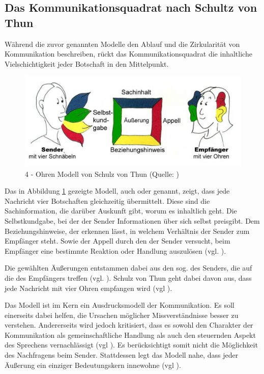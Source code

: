 \subsection{Das Kommunikationsquadrat nach Schultz von Thun}
Während die zuvor genannten Modelle den Ablauf und die Zirkularität von Kommunikation beschreiben, rückt das Kommunikationsquadrat die inhaltliche Vielschichtigkeit jeder Botschaft in den Mittelpunkt.

\begin{figure}[ht]
\centering
\includegraphics[width=1\linewidth]{content/pictures/Kommunikationsquadrat.PNG}
\caption{4 - Ohren Modell von Schulz von Thun (Quelle: \citealp{noauthor_kommunikationsquadrat_nodate})}
\label{fig:four-ears}
\end{figure}

Das in Abbildung \ref{fig:four-ears} gezeigte Modell, auch  oder  genannt, zeigt, dass jede Nachricht vier Botschaften gleichzeitig übermittelt. Diese sind die Sachinformation, die darüber Auskunft gibt, worum es inhaltlich geht. Die Selbstkundgabe, bei der der Sender Informationen über sich selbst preisgibt. Dem Beziehungshinweise, der erkennen lässt, in welchem Verhältnis der Sender zum Empfänger steht. Sowie der Appell durch den der Sender versucht, beim Empfänger eine bestimmte Reaktion oder Handlung auszulösen (vgl. \citealp{noauthor_kommunikationsquadrat_nodate}).

Die gewählten Äußerungen entstammen dabei aus den sog.  des Senders, die auf die  des Empfängers treffen (vgl. \citealp{noauthor_kommunikationsquadrat_nodate}). Schulz von Thun geht dabei davon aus, dass jede Nachricht mit vier Ohren empfangen wird (vgl \citealp[S. 23]{becker_praxishandbuch_2018}). 

Das Modell ist im Kern ein Ausdrucksmodell der Kommunikation. Es soll einerseits dabei helfen, die Ursachen möglicher Missverständnisse besser zu verstehen. Andererseits wird jedoch kritisiert, dass es sowohl den Charakter der Kommunikation als gemeinschaftliche Handlung als auch den steuernden Aspekt des Sprechens vernachlässigt (vgl \citealp[S. 23]{becker_praxishandbuch_2018}). Es berücksichtigt somit nicht die Möglichkeit des Nachfragens beim Sender. Stattdessen legt das Modell nahe, dass jeder Äußerung ein einziger  Bedeutungskern innewohne (vgl \citealp[S. 23]{becker_praxishandbuch_2018}). 

